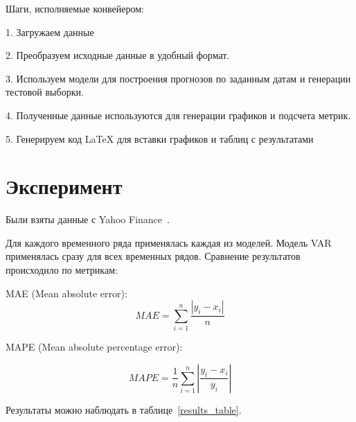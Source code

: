 \documentclass[a4paper,article,14pt]{extarticle}
\begin{document}
Шаги, исполняемые конвейером:

1.
Загружаем данные

2.
Преобразуем исходные данные в удобный формат.

3.
Используем модели для построения прогнозов по заданным датам и генерации тестовой выборки.

4.
Полученные данные используются для генерации графиков и подсчета метрик.

5.
Генерируем код LaTeX для вставки графиков и таблиц с результатами

\section{Эксперимент}

Были взяты данные с Yahoo Finance~\cite{yahoo}.




Для каждого временного ряда применялась каждая из моделей.
Модель VAR применялась сразу для всех временных рядов.
Сравнение результатов происходило по метрикам:

MAE (Mean absolute error):
\begin{equation}
    MAE = \sum_{i=1}^{n} \frac{|y_i - x_i|}{n}\label{eq:mae}
\end{equation}

MAPE (Mean absolute percentage error):

\begin{equation}
    MAPE = \frac{1}{n} \sum_{i=1}^{n} \left| \frac{y_i - x_i}{y_i} \right|\label{eq:mape}
\end{equation}

\begin{comment}
RMSE (Root mean square error)
\begin{equation}
    RMSE = \sqrt{\sum_{i=1}^{n} \frac{(x_i - y_i) ^ 2}{n}}\label{eq:rmse}
\end{equation}
\end{comment}

Результаты можно наблюдать в таблице~\ref{results_table}.

\end{document}
